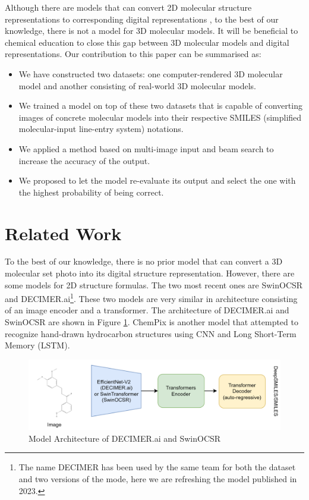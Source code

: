\documentclass[12pt]{article}
\begin{document}
Although there are models that can convert 2D molecular structure representations to corresponding digital representations \autocite{swinocsr}\autocite{decimer}\autocite{chempix}, to the best of our knowledge, there is not a model for 3D molecular models. It will be beneficial to chemical education to close this gap between 3D molecular models and digital representations. 
Our contribution to this paper can be summarised as:
\begin{itemize}
\item We have constructed two datasets: one computer-rendered 3D molecular model and another consisting of real-world 3D molecular models.
\item We trained a model on top of these two datasets that is capable of converting images of concrete molecular models into their respective SMILES (simplified molecular-input line-entry system) notations. 
\item We applied a method based on multi-image input and beam search to increase the accuracy of the output.
\item  We proposed to let the model re-evaluate its output and select the one with the highest probability of being correct.
\end{itemize}

\section{Related Work}
To the best of our knowledge, there is no prior model that can convert a 3D molecular set photo into its digital structure representation. However, there are some models for 2D structure formulas. The two most recent ones are SwinOCSR\autocite{swinocsr} and DECIMER.ai\footnote{The name DECIMER has been used by the same team for both the dataset and two versions of the mode, here we are refreshing the model published in 2023.}\autocite{decimer}. These two models are very similar in architecture consisting of an image encoder and a transformer. The architecture of DECIMER.ai and SwinOCSR are shown in Figure \ref{fig:rwa}.
ChemPix is another model that attempted to recognize hand-drawn hydrocarbon structures using CNN and Long Short-Term Memory (LSTM).  

\begin{figure}
    \centering
    \includegraphics[width=\textwidth]{related_work_arch.png}
    \caption{Model Architecture of DECIMER.ai and SwinOCSR}
    \label{fig:rwa}
\end{figure}
\end{document}
